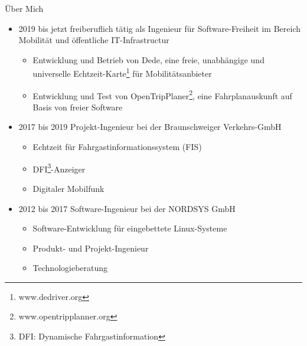 
\begin{frame}{Über Mich}
  \begin{itemize}
  \item<1-1> 2019 bis jetzt freiberuflich tätig als Ingenieur für Software-Freiheit im Bereich Mobilität und öffentliche IT-Infrastructur
    \begin{itemize}
    \item<1-1> Entwicklung und Betrieb von Dede, eine freie, unabhängige und universelle Echtzeit-Karte\footnote{www.dedriver.org} für Mobilitätsanbieter
    \item<1-1> Entwicklung und Test von OpenTripPlaner\footnote{www.opentripplanner.org}, eine Fahrplanauskunft auf Basis von freier Software
    \end{itemize}
  \item<2-2> 2017 bis 2019 Projekt-Ingenieur bei der Braunschweiger Verkehrs-GmbH
    \begin{itemize}
    \item<2-2> Echtzeit für Fahrgastinformationssystem (FIS)
    \item<2-2> DFI\footnote{DFI: Dynamische Fahrgastinformation}-Anzeiger
    \item<2-2> Digitaler Mobilfunk
    \end{itemize}
  \item<3-3> 2012 bis 2017 Software-Ingenieur bei der NORDSYS GmbH
    \begin{itemize}
    \item<3-3> Software-Entwicklung für eingebettete Linux-Systeme
    \item<3-3> Produkt- und Projekt-Ingenieur
    \item<3-3> Technologieberatung
    \end{itemize}
  \end{itemize}
\end{frame}
